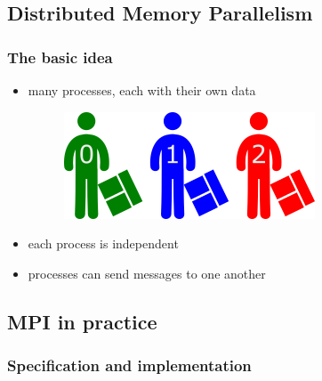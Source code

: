 \subsection{Distributed Memory
Parallelism}\label{distributed-memory-parallelism-1}

\subsubsection{The basic idea}\label{the-basic-idea}

\begin{itemize}
\item
  many processes, each with their own data

  \begin{figure}[htbp]
  \centering
  \includegraphics{06MPI/figures/many.png}
  \end{figure}
\item
  each process is independent
\item
  processes can send messages to one another
\end{itemize}

\subsection{MPI in practice}\label{mpi-in-practice}

\subsubsection{Specification and
implementation}\label{specification-and-implementation}

